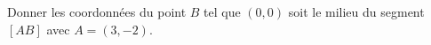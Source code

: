 
\begin{exercice}\label{exoSeconde-0056}

    Donner les coordonnées du point \( B\) tel que \( (0,0)\) soit le milieu du segment \( [AB]\) avec \( A=(3,-2)\).

\end{exercice}
